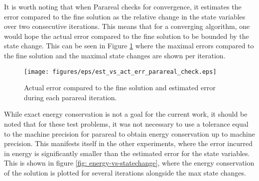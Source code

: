 \newline 
It is worth noting that when Parareal checks for convergence, it estimates the error compared to the fine solution as the relative change in the state variables over two consecutive iterations. This means that for a converging algorithm, one would hope the actual error compared to the fine solution to be bounded by the state change. This can be seen in Figure \ref{fig: error-vs-statechange} where the maximal errors compared to the fine solution and the maximal state changes are shown per iteration. 
\begin{figure}[h]
    \centering
    \texttt{[image: figures/eps/est\_vs\_act\_err\_parareal\_check.eps]}
    \caption{Actual error compared to the fine solution and estimated error during each parareal iteration.}
    \label{fig: error-vs-statechange}
\end{figure}

While exact energy conservation is not a goal for the current work, it should be noted that for these test problems, it was not necessary to use a tolerance equal to the machine precision for parareal to obtain energy conservation up to machine precision.  This manifests itself in the other experiments, where the error incurred in energy is significantly smaller than the estimated error for the state variables. This is shown in figure \ref{fig: energy-vs-statechange}, where the energy conservation of the solution is plotted for several iterations alongside the max state changes.

